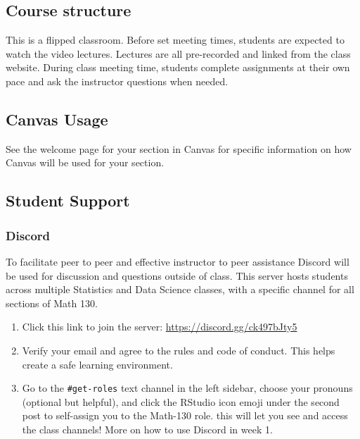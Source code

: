 \documentclass[
  11pt,
]{article}
\providecommand{\tightlist}{%
  \setlength{\itemsep}{0pt}\setlength{\parskip}{0pt}}
\begin{document}
\subsection{Course structure}\label{course-structure}

This is a flipped classroom. Before set meeting times, students are
expected to watch the video lectures. Lectures are all pre-recorded and
linked from the class website. During class meeting time, students
complete assignments at their own pace and ask the instructor questions
when needed.

\subsection{Canvas Usage}\label{canvas-usage}

See the welcome page for your section in Canvas for specific information
on how Canvas will be used for your section.

\subsection{Student Support}\label{student-support}

\subsubsection{Discord}\label{discord}

To facilitate peer to peer and effective instructor to peer assistance
Discord will be used for discussion and questions outside of class. This
server hosts students across multiple Statistics and Data Science
classes, with a specific channel for all sections of Math 130.

\begin{enumerate}
\def\labelenumi{\arabic{enumi}.}
\tightlist
\item
  Click this link to join the server:
  \url{https://discord.gg/ck497bJty5}
\item
  Verify your email and agree to the rules and code of conduct. This
  helps create a safe learning environment.
\item
  Go to the \texttt{\#get-roles} text channel in the left sidebar,
  choose your pronouns (optional but helpful), and click the RStudio
  icon emoji under the second post to self-assign you to the Math-130
  role. this will let you see and access the class channels! More on how
  to use Discord in week 1.
\end{enumerate}
\end{document}
